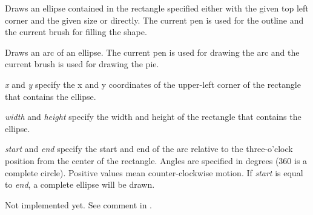 

\label{wxlatexdcdrawellipse}




Draws an ellipse contained in the rectangle specified either with the given top
left corner and the given size or directly. The current pen is used for the
outline and the current brush for filling the shape.



\label{wxlatexdcdrawellipticarc}


Draws an arc of an ellipse. The current pen is used for drawing the arc and
the current brush is used for drawing the pie.

{\it x} and {\it y} specify the x and y coordinates of the upper-left corner of the rectangle that contains
the ellipse.

{\it width} and {\it height} specify the width and height of the rectangle that contains
the ellipse.

{\it start} and {\it end} specify the start and end of the arc relative to the three-o'clock
position from the center of the rectangle. Angles are specified
in degrees (360 is a complete circle). Positive values mean
counter-clockwise motion. If {\it start} is equal to {\it end}, a
complete ellipse will be drawn.

\label{wxlatexdcdrawicon}


Not implemented yet. See comment in .

